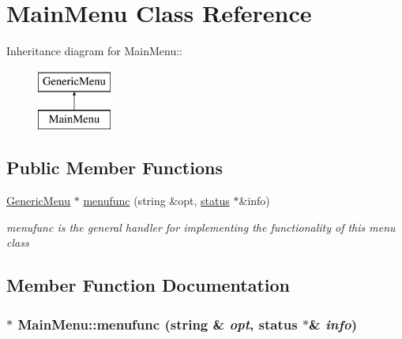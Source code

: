 \hypertarget{classMainMenu}{
\section{MainMenu Class Reference}
\label{classMainMenu}
}
Inheritance diagram for MainMenu::\begin{figure}[H]
\begin{center}
\leavevmode
\includegraphics[height=2cm]{classMainMenu}
\end{center}
\end{figure}
\subsection*{Public Member Functions}
\begin{DoxyCompactItemize}
\item 
\hyperlink{classGenericMenu}{GenericMenu} $\ast$ \hyperlink{classMainMenu_aed53ec0c027843a2a1204235fe2924ea}{menufunc} (string \&opt, \hyperlink{classstatus}{status} $\ast$\&info)
\begin{DoxyCompactList}\small\item\em menufunc is the general handler for implementing the functionality of this menu class \item\end{DoxyCompactList}\end{DoxyCompactItemize}


\subsection{Member Function Documentation}
\hypertarget{classMainMenu_aed53ec0c027843a2a1204235fe2924ea}{
\subsubsection[{menufunc}]{ $\ast$ MainMenu::menufunc (string \& {\em opt}, \/  {\bf status} $\ast$\& {\em info})}}
\label{classMainMenu_aed53ec0c027843a2a1204235fe2924ea}


